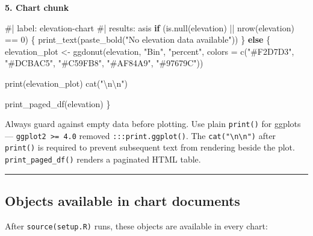 \documentclass[
  letterpaper,
  DIV=11,
  numbers=noendperiod]{scrreprt}
\newenvironment{Shaded}{\begin{snugshade}}{\end{snugshade}}
\newcommand{\AttributeTok}[1]{\textcolor[rgb]{0.40,0.45,0.13}{#1}}
\newcommand{\CommentTok}[1]{\textcolor[rgb]{0.37,0.37,0.37}{#1}}
\newcommand{\ControlFlowTok}[1]{\textcolor[rgb]{0.00,0.23,0.31}{\textbf{#1}}}
\newcommand{\DecValTok}[1]{\textcolor[rgb]{0.68,0.00,0.00}{#1}}
\newcommand{\FunctionTok}[1]{\textcolor[rgb]{0.28,0.35,0.67}{#1}}
\newcommand{\NormalTok}[1]{\textcolor[rgb]{0.00,0.23,0.31}{#1}}
\newcommand{\OtherTok}[1]{\textcolor[rgb]{0.00,0.23,0.31}{#1}}
\newcommand{\SpecialCharTok}[1]{\textcolor[rgb]{0.37,0.37,0.37}{#1}}
\newcommand{\StringTok}[1]{\textcolor[rgb]{0.13,0.47,0.30}{#1}}
\begin{document}
\textbf{5. Chart chunk}

\begin{Shaded}
\begin{Highlighting}[]
\CommentTok{\#| label: elevation{-}chart}
\CommentTok{\#| results: asis}
\ControlFlowTok{if}\NormalTok{ (}\FunctionTok{is.null}\NormalTok{(elevation) }\SpecialCharTok{||} \FunctionTok{nrow}\NormalTok{(elevation) }\SpecialCharTok{==} \DecValTok{0}\NormalTok{) \{}
  \FunctionTok{print\_text}\NormalTok{(}\FunctionTok{paste\_bold}\NormalTok{(}\StringTok{"No elevation data available"}\NormalTok{))}
\NormalTok{\} }\ControlFlowTok{else}\NormalTok{ \{}
\NormalTok{  elevation\_plot }\OtherTok{\textless{}{-}} \FunctionTok{ggdonut}\NormalTok{(elevation, }\StringTok{"Bin"}\NormalTok{, }\StringTok{"percent"}\NormalTok{,}
    \AttributeTok{colors =} \FunctionTok{c}\NormalTok{(}\StringTok{"\#F2D7D3"}\NormalTok{, }\StringTok{"\#DCBAC5"}\NormalTok{, }\StringTok{"\#C59FB8"}\NormalTok{, }\StringTok{"\#AF84A9"}\NormalTok{, }\StringTok{"\#97679C"}\NormalTok{))}

  \FunctionTok{print}\NormalTok{(elevation\_plot)}
  \FunctionTok{cat}\NormalTok{(}\StringTok{"}\SpecialCharTok{\textbackslash{}n\textbackslash{}n}\StringTok{"}\NormalTok{)}

  \FunctionTok{print\_paged\_df}\NormalTok{(elevation)}
\NormalTok{\}}
\end{Highlighting}
\end{Shaded}

Always guard against empty data before plotting. Use plain
\texttt{print()} for ggplots --- \texttt{ggplot2\ \textgreater{}=\ 4.0}
removed \texttt{:::print.ggplot()}. The
\texttt{cat("\textbackslash{}n\textbackslash{}n")} after
\texttt{print()} is required to prevent subsequent text from rendering
beside the plot. \texttt{print\_paged\_df()} renders a paginated HTML
table.

\begin{center}\rule{0.5\linewidth}{0.5pt}\end{center}

\subsection{Objects available in chart
documents}\label{objects-available-in-chart-documents}

After \texttt{source(setup.R)} runs, these objects are available in
every chart:
\end{document}
